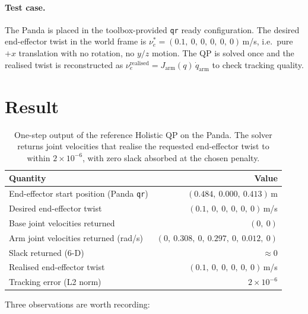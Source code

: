 \documentclass[11pt]{article}
\begin{document}
\paragraph{Test case.} The Panda is placed in the toolbox-provided
\texttt{qr} ready configuration. The desired end-effector twist in the
world frame is
\(\nu^*_e = (0.1,\ 0,\ 0,\ 0,\ 0,\ 0)\,\)m/s, i.e.\ pure $+x$
translation with no rotation, no $y/z$ motion. The QP is solved once and
the realised twist is reconstructed as
\(\nu^{\text{realised}}_e = J_{\text{arm}}(q)\,\dot{q}_{\text{arm}}\)
to check tracking quality.

\section{Result}

\begin{table}[H]
\centering
\begin{tabular}{lr}
\toprule
\textbf{Quantity} & \textbf{Value} \\
\midrule
End-effector start position (Panda \texttt{qr}) & $(0.484,\ 0.000,\ 0.413)\,$m \\
Desired end-effector twist                       & $(0.1,\ 0,\ 0,\ 0,\ 0,\ 0)\,$m/s \\
Base joint velocities returned                   & $(0,\ 0)$ \\
Arm joint velocities returned (rad/s)            & $(0,\ 0.308,\ 0,\ 0.297,\ 0,\ 0.012,\ 0)$ \\
Slack returned (6-D)                              & $\approx 0$ \\
Realised end-effector twist                      & $(0.1,\ 0,\ 0,\ 0,\ 0,\ 0)\,$m/s \\
Tracking error (L2 norm)                          & $2\times 10^{-6}$ \\
\bottomrule
\end{tabular}
\caption{One-step output of the reference Holistic QP on the Panda.
The solver returns joint velocities that realise the requested
end-effector twist to within $2\times 10^{-6}$, with zero slack absorbed
at the chosen penalty.}
\end{table}

Three observations are worth recording:
\end{document}
